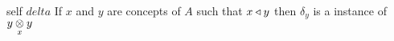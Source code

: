 
\begin{frame}{self $delta$}
If $x$ and $y$ are concepts of $A$ such that $x \base y$ then $\delta_y$ is a instance of $\crossx{y}{y}{x}$
\vspace{0.5cm}

 
\end{frame}


